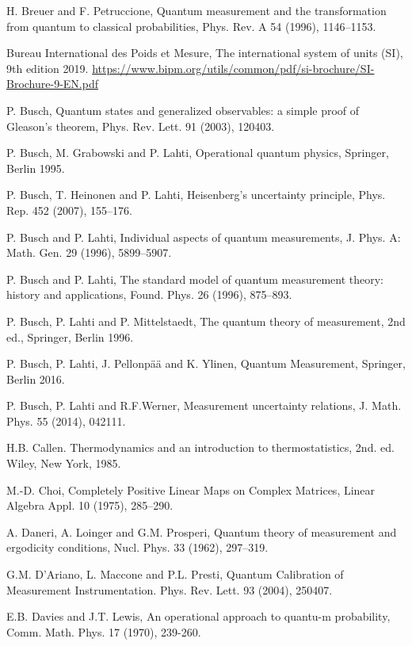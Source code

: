 \documentclass[12pt]{article}
\begin{document}
\begin{thebibliography}{99}
 H. Breuer and F. Petruccione,
Quantum measurement and the transformation from quantum to classical
probabilities,
Phys. Rev. A 54 (1996), 1146--1153.

 Bureau International des Poids et Mesure,
The international system of units (SI), 9th edition 2019.
\url{https://www.bipm.org/utils/common/pdf/si-brochure/SI-Brochure-9-EN.pdf}

 P. Busch,
Quantum states and generalized observables: a simple proof of
Gleason's theorem,
Phys. Rev. Lett. 91 (2003), 120403.

 P. Busch, M. Grabowski and P. Lahti,
Operational quantum physics,
Springer, Berlin 1995.

 P. Busch, T. Heinonen and P. Lahti,
Heisenberg's uncertainty principle,
Phys. Rep. 452 (2007), 155--176.

 P. Busch and P. Lahti,
Individual aspects of quantum measurements,
J. Phys. A: Math. Gen. 29 (1996), 5899--5907.

 P. Busch and P. Lahti,
The standard model of quantum measurement theory: history and
applications,
Found. Phys. 26 (1996), 875--893.

 P. Busch, P. Lahti and P. Mittelstaedt,
The quantum theory of measurement, 2nd ed.,
Springer, Berlin 1996.

 P. Busch, P. Lahti, J. Pellonp\"a\"a and K. Ylinen,
Quantum Measurement,
Springer, Berlin 2016.

 P. Busch, P. Lahti and R.F.Werner,
Measurement uncertainty relations,
J. Math. Phys. 55 (2014), 042111.

 H.B. Callen.
Thermodynamics and an introduction to thermostatistics,
2nd. ed.
Wiley, New York, 1985.

 M.-D. Choi, 
Completely Positive Linear Maps on Complex Matrices, 
Linear Algebra Appl. 10 (1975), 285--290.

 A. Daneri, A. Loinger and G.M. Prosperi,
Quantum theory of measurement and ergodicity conditions,
Nucl. Phys. 33 (1962), 297--319.

 G.M. D'Ariano, L. Maccone and P.L. Presti,
Quantum Calibration of Measurement Instrumentation.
Phys. Rev. Lett. 93 (2004), 250407.

 E.B. Davies and J.T. Lewis,
An operational approach to quantu-m probability,
Comm. Math. Phys. 17 (1970), 239-260.


\end{thebibliography}
\end{document}
